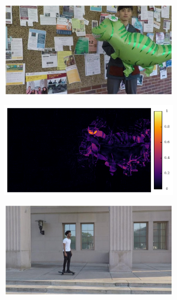 \documentclass{article}
\begin{document}
\begin{figure}[h]
\begin{subfigure}{0.2\textwidth}
\end{subfigure}%
\begin{subfigure}{0.2\textwidth}
	\centering
    \includegraphics[width=1\linewidth]{nd_scene/Balloon1_I1.jpg}
\end{subfigure}%
\begin{subfigure}{0.2\textwidth}
	\centering
    \includegraphics[width=1\linewidth]{nd_scene/Balloon1_error.png}
\end{subfigure}
\begin{subfigure}{0.2\textwidth}
	\centering
    \includegraphics[width=1\linewidth]{nd_scene/Skating_I0.jpg}

\end{subfigure}
\end{figure}
\end{document}
